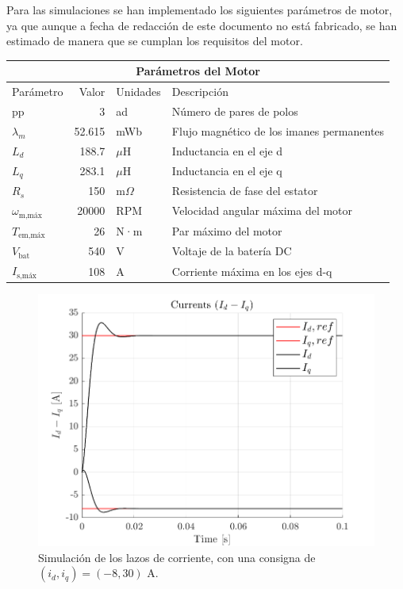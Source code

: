 Para las simulaciones se han implementado los siguientes parámetros de motor, ya que aunque a fecha de redacción de este documento no está fabricado, se han estimado de manera que se cumplan los requisitos del motor.


\begin{tabular}{|p{2cm}||r|p{1.5cm}|p{8cm}|}
	\hline
	\multicolumn{4}{|c|}{Parámetros del Motor} \\
	\hline
	Parámetro & Valor & Unidades & Descripción \\
	\hline
	pp & 3 & ad & Número de pares de polos \\
	$\lambda_m$ & 52.615 & mWb & Flujo magnético de los imanes permanentes \\
	$L_d$ & 188.7 & $\mu$H & Inductancia en el eje d \\
	$L_q$ & 283.1 & $\mu$H & Inductancia en el eje q \\
	$R_s$ & 150 & m$\Omega$ & Resistencia de fase del estator \\
	$\omega_{\text{m,máx}}$ & 20000 & RPM & Velocidad angular máxima del motor \\
	$T_{\text{em,máx}}$ & 26 & N·m & Par máximo del motor \\
	$V_{\text{bat}}$ & 540 & V & Voltaje de la batería DC \\
	$I_{\text{s,máx}}$ & 108 & A & Corriente máxima en los ejes d-q \\
	\hline
\end{tabular}



\begin{figure}[H]
    \centering
    \includegraphics[width=0.75\linewidth]{fig/idiq_plot_PI.png}
    \caption{Simulación de los lazos de corriente, con una consigna de $(i_d, i_q) = (-8, 30) \text{ A}$.}
\end{figure}


